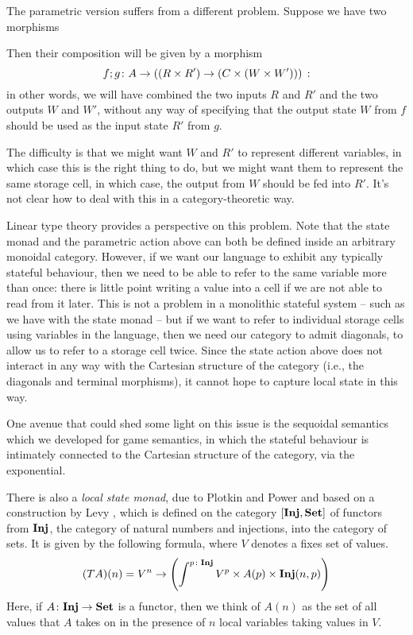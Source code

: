 \documentclass[11pt]{report}
\begin{document}
The parametric version suffers from a different problem.  
Suppose we have two \Mellies morphisms
Then their composition will be given by a \Mellies morphism
\[
  f;g \colon A \to ((R \times R') \to (C \times (W \times W')))\,:
  \]
in other words, we will have combined the two inputs $R$ and $R'$ and the two outputs $W$ and $W'$, without any way of specifying that the output state $W$ from $f$ should be used as the input state $R'$ from $g$.

The difficulty is that we might want $W$ and $R'$ to represent different variables, in which case this is the right thing to do, but we might want them to represent the same storage cell, in which case, the output from $W$ should be fed into $R'$.  
It's not clear how to deal with this in a category-theoretic way.

Linear type theory provides a perspective on this problem.  
Note that the state monad and the parametric action above can both be defined inside an arbitrary monoidal category.  
However, if we want our language to exhibit any typically stateful behaviour, then we need to be able to refer to the same variable more than once: there is little point writing a value into a cell if we are not able to read from it later.  
This is not a problem in a monolithic stateful system -- such as we have with the state monad -- but if we want to refer to individual storage cells using variables in the language, then we need our category to admit diagonals, to allow us to refer to a storage cell twice.
Since the state action above does not interact in any way with the Cartesian structure of the category (i.e., the diagonals and terminal morphisms), it cannot hope to capture local state in this way.

One avenue that could shed some light on this issue is the sequoidal semantics which we developed for game semantics, in which the stateful behaviour is intimately connected to the Cartesian structure of the category, via the exponential.

There is also a \emph{local state monad}, due to Plotkin and Power \cite{PlotkinPower} and based on a construction by Levy \cite{PaulsThesis}, which is defined on the category $[{\normalfont\textbf{Inj}},{\normalfont\textbf{Set}}]$ of functors from ${\normalfont\textbf{Inj}}$, the category of natural numbers and injections, into the category of sets.  
It is given by the following formula, where $V$ denotes a fixes set of values.
\[
  (TA)(n) = V^n \to \left( \int^{p\colon{\normalfont\textbf{Inj}}} V^p \times A(p) \times {\normalfont\textbf{Inj}}(n, p) \right)
  \]
Here, if $A \colon {\normalfont\textbf{Inj}} \to {\normalfont\textbf{Set}}$ is a functor, then we think of $A(n)$ as the set of all values that $A$ takes on in the presence of $n$ local variables taking values in $V$.
\end{document}
